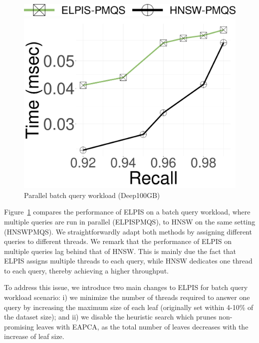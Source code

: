 \begin{figure}[tb] 
\centering
		\captionsetup{justification=centering}
  		\includegraphics[width=0.4\columnwidth]{../img/elpis2/pre/legendpre.png}
    
		\includegraphics[width=0.4\columnwidth]{../img/elpis2/pre/deep_Time.png}
		\caption{Parallel batch query workload (Deep100GB)}       
		\label{fig:elpis2:pre}
 \end{figure}

Figure~\ref{fig:elpis2:pre}
 compares the performance of ELPIS on a batch query workload, where multiple queries are run in parallel (ELPISPMQS), to HNSW on the same setting (HNSWPMQS). We straightforwardly adapt both methods by assigning different queries to different threads. We remark that the performance of ELPIS on multiple queries lag behind that of HNSW. This is mainly due the fact that ELPIS assigns multiple threads to each query, while HNSW dedicates one thread to each query, thereby achieving a higher throughput.
 
To address this issue, we introduce two main changes to ELPIS for batch query workload scenario: i) we minimize the number of threads required to answer one query by increasing the maximum size of each leaf (originally set within 4-10\% of the dataset size); and ii) we disable the heuristic search which prunes non-promising leaves with EAPCA, as the total number of leaves decreases with the increase of leaf size.

